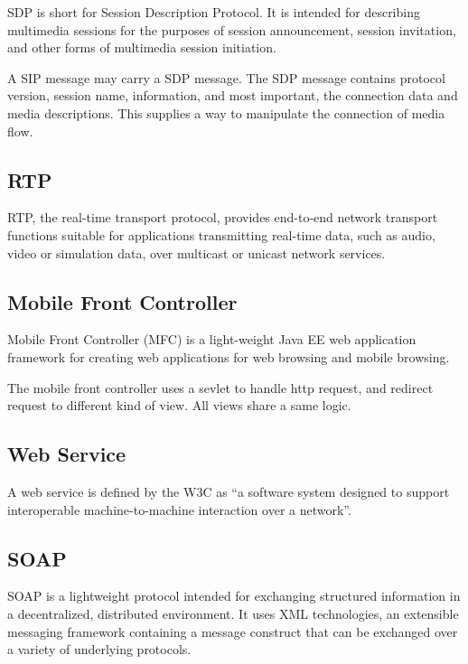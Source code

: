 SDP is short for Session Description Protocol. It is intended for describing multimedia sessions for the purposes of session announcement, session invitation, and other forms of multimedia session initiation.\cite{RFC4566}

A SIP message may carry a SDP message. The SDP message contains protocol version, session name, information, and most important, the connection data and media descriptions. This supplies a way to manipulate the connection of media flow. 

\subsection*{RTP}
\label{sec:RTP}
\label{sym:RTP}

RTP, the real-time transport protocol, provides end-to-end network transport functions suitable for applications transmitting real-time data, such as audio, video or simulation data, over multicast or unicast network services.\cite{RFC3550}

\subsection*{Mobile Front Controller}
\label{sec:MobileFrontController}
\label{MFC}

Mobile Front Controller (MFC) is a light-weight Java EE web application framework for creating web applications for web browsing and mobile browsing. \cite{MobileFrontController}

The mobile front controller uses a sevlet to handle http request, and redirect request to different kind of view. All views share a same logic. 

\subsection*{Web Service}
\label{sec:WebService}

A web service is defined by the W3C as ``a software system designed to support interoperable machine-to-machine interaction over a network''.\cite{WebServicesGlossary}

\subsection*{SOAP}
\label{sec:SOAP}
\label{sym:SOAP}

SOAP is a lightweight protocol intended for exchanging structured information in a decentralized, distributed environment. It uses XML technologies, an extensible messaging framework containing a message construct that can be exchanged over a variety of underlying protocols.\cite{SOAPVersion1dot2}

